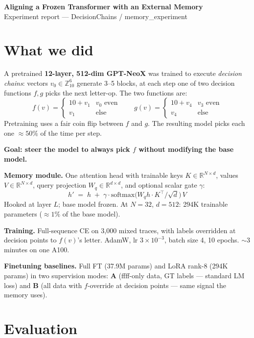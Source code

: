 \documentclass[10pt]{article}
\begin{document}
\begin{center}
  {\Large\bfseries Aligning a Frozen Transformer with an External Memory}\\[2pt]
  {\small Experiment report --- DecisionChains / memory\_experiment}
\end{center}

\section{What we did}

A pretrained \textbf{12-layer, 512-dim GPT-NeoX} was trained to execute
\emph{decision chains}: vectors $v_0 \in \mathbb{Z}_{10}^6$ generate 3--5
blocks, at each step one of two decision functions $f, g$ picks the next
letter-op. The two functions are:
\[
  f(v) = \begin{cases} 10 + v_1 & v_0\text{ even} \\ v_1 & \text{else} \end{cases}
  \qquad
  g(v) = \begin{cases} 10 + v_4 & v_3\text{ even} \\ v_4 & \text{else} \end{cases}
\]
Pretraining uses a fair coin flip between $f$ and $g$. The resulting model
picks each one $\approx 50\%$ of the time per step.

\textbf{Goal: steer the model to always pick $f$ without modifying the
base model.}

\textbf{Memory module.} One attention head with trainable keys
$K \in \mathbb{R}^{N \times d}$, values $V \in \mathbb{R}^{N \times d}$,
query projection $W_q \in \mathbb{R}^{d \times d}$, and optional scalar
gate $\gamma$:
\[
  h' \;=\; h \;+\; \gamma \cdot \mathrm{softmax}\!\bigl(W_q h \cdot K^\top / \sqrt{d}\bigr)\,V
\]
Hooked at layer $L$; base model frozen. At $N{=}32$, $d{=}512$: 294K
trainable parameters ($\approx 1\%$ of the base model).

\textbf{Training.} Full-sequence CE on 3{,}000 mixed traces, with labels
overridden at decision points to $f(v)$'s letter. AdamW, lr $3 \times
10^{-3}$, batch size 4, 10 epochs. $\sim$3 minutes on one A100.

\textbf{Finetuning baselines.} Full FT (37.9M params) and LoRA rank-8
(294K params) in two supervision modes: \textbf{A} (ffff-only data, GT
labels --- standard LM loss) and \textbf{B} (all data with $f$-override at
decision points --- same signal the memory uses).

\section{Evaluation}
\end{document}

